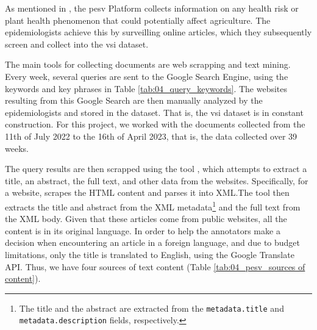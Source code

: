 \label{vsi_dataset}

As mentioned in \headerName{} , the \gls{pesv} Platform collects information on any health risk or plant health phenomenon that could potentially affect agriculture. The epidemiologists achieve this by surveilling online articles, which they subsequently screen and collect into the \gls{vsi} dataset.

\label{vsi_data_collection}


The main tools for collecting documents are web scrapping and text mining. Every week, several queries are sent to the Google Search Engine, using the keywords and key phrases in Table \ref{tab:04_query_keywords}. 
The websites resulting from this Google Search are then manually analyzed by the epidemiologists and stored in the dataset. That is, the \gls{vsi} dataset is in constant construction. 
For this project, we worked with the documents collected from the 11th of July 2022 to the 16th of April 2023, that is, the data collected over 39 weeks.





The query results are then scrapped using the tool \trafilatura{} , which attempts to extract a title, an abstract, the full text, and other data from the websites.
Specifically, for a website, \trafilatura{} scrapes the HTML content and parses it into XML.The tool then extracts the title and abstract from the XML metadata\footnote{The title and the abstract are extracted from the \texttt{metadata.title} and \texttt{metadata.description} fields, respectively.} and the full text from the XML body.
Given that these articles come from public websites, all the content is in its original language.
In order to help the annotators make a decision when encountering an article in a foreign language, and due to budget limitations, only the title is translated to English, using the Google Translate API. Thus, we have four sources of text content (Table \ref{tab:04_pesv_sources of content}).





\label{vsi_data_annotation}

